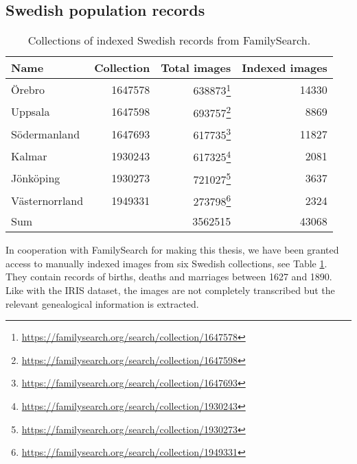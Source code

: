 \subsection{Swedish population records}

\begin{table}
\centering
\begin{tabular}{ l | r r r}
Name & Collection & Total images & Indexed images \\
\hline
Örebro	& 1647578	& 638873\footnote{\url{https://familysearch.org/search/collection/1647578}}	& 14330 \\
Uppsala	& 1647598	& 693757\footnote{\url{https://familysearch.org/search/collection/1647598}}	& 8869 \\
Södermanland	& 1647693	& 617735\footnote{\url{https://familysearch.org/search/collection/1647693}}	& 11827 \\
Kalmar	& 1930243	& 617325\footnote{\url{https://familysearch.org/search/collection/1930243}}	& 2081 \\
Jönköping	& 1930273	& 721027\footnote{\url{https://familysearch.org/search/collection/1930273}}	& 3637 \\
Västernorrland	& 1949331	& 273798\footnote{\url{https://familysearch.org/search/collection/1949331}}	& 2324 \\
\hline
Sum & & 3562515 & 43068
\end{tabular}
\caption{Collections of indexed Swedish records from FamilySearch.}
\label{tab:collections}
\end{table}

In cooperation with FamilySearch for making this thesis, we have been granted access to manually indexed images from six Swedish collections, see Table \ref{tab:collections}. They contain records of births, deaths and marriages between 1627 and 1890. Like with the IRIS dataset, the images are not completely transcribed but the relevant genealogical information is extracted.
